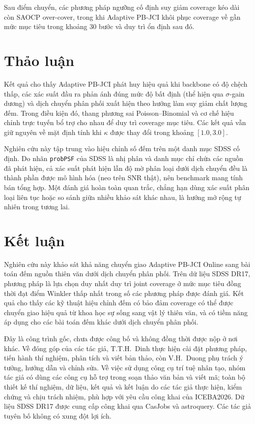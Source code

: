 \documentclass[pdflatex,sn-mathphys-num]{sn-jnl}
\begin{document}
Sau điểm chuyển, các phương pháp ngưỡng cố định suy giảm coverage kéo dài còn SAOCP over-cover, trong khi
Adaptive PB-JCI khôi phục coverage về gần mức mục tiêu trong khoảng $30$ bước và duy trì ổn định sau đó.

\section{Thảo luận}\label{sec:discussion}

Kết quả cho thấy Adaptive PB-JCI phát huy hiệu quả khi backbone có độ chệch thấp, các xác suất đầu ra phản
ánh đúng mức độ bất định (thể hiện qua $\sigma$-gain dương) và dịch chuyển phân phối xuất hiện theo hướng làm
suy giảm chất lượng đếm. Trong điều kiện đó, thang phương sai Poisson--Binomial và cơ chế hiệu chỉnh trực
tuyến bổ trợ cho nhau để duy trì coverage mục tiêu. Các kết quả vẫn giữ nguyên về mặt định tính khi $\kappa$
được thay đổi trong khoảng $[1.0, 3.0]$.

Nghiên cứu này tập trung vào hiệu chỉnh số đếm trên một danh mục SDSS cố định. Do nhãn \texttt{probPSF} của
SDSS là nhị phân và danh mục chỉ chứa các nguồn đã phát hiện, cả xác suất phát hiện lẫn độ mờ phân loại dưới
dịch chuyển đều là thành phần được mô hình hóa (neo trên SNR thật), nên benchmark mang tính bán tổng hợp. Một
đánh giá hoàn toàn quan trắc, chẳng hạn dùng xác suất phân loại liên tục hoặc so sánh giữa nhiều khảo sát
khác nhau, là hướng mở rộng tự nhiên trong tương lai.

\section{Kết luận}\label{sec:conclusion}

Nghiên cứu này khảo sát khả năng chuyển giao Adaptive PB-JCI Online sang bài toán đếm nguồn thiên văn dưới
dịch chuyển phân phối. Trên dữ liệu SDSS DR17, phương pháp là lựa chọn duy nhất duy trì joint coverage ở mức
mục tiêu đồng thời đạt điểm Winkler thấp nhất trong số các phương pháp được đánh giá. Kết quả cho thấy các kỹ
thuật hiệu chỉnh đếm có bảo đảm coverage có thể được chuyển giao hiệu quả từ khoa học sự sống sang vật lý
thiên văn, và có tiềm năng áp dụng cho các bài toán đếm khác dưới dịch chuyển phân phối.

\backmatter

Đây là công trình gốc, chưa được công bố và không đồng thời được nộp ở nơi khác. Về đóng góp của các tác giả,
T.T.H.~Dinh thực hiện cài đặt phương pháp, tiến hành thí nghiệm, phân tích và viết bản thảo, còn V.H.~Duong
phụ trách ý tưởng, hướng dẫn và chỉnh sửa. Về việc sử dụng công cụ trí tuệ nhân tạo, nhóm tác giả có dùng các
công cụ hỗ trợ trong soạn thảo văn bản và viết mã; toàn bộ thiết kế thí nghiệm, dữ liệu, kết quả và kết luận
do các tác giả thực hiện, kiểm chứng và chịu trách nhiệm, phù hợp với yêu cầu công khai của ICEBA2026. Dữ
liệu SDSS DR17 được cung cấp công khai qua CasJobs và astroquery. Các tác giả tuyên bố không có xung đột lợi
ích.


\end{document}
